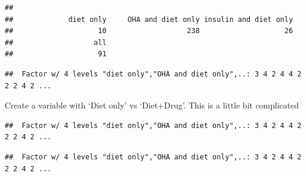 \documentclass[]{book}
\newenvironment{Shaded}{\begin{snugshade}}{\end{snugshade}}
\newcommand{\KeywordTok}[1]{\textcolor[rgb]{0.13,0.29,0.53}{\textbf{#1}}}
\newcommand{\OperatorTok}[1]{\textcolor[rgb]{0.81,0.36,0.00}{\textbf{#1}}}
\newcommand{\NormalTok}[1]{#1}
\theoremstyle{definition}
\theoremstyle{definition}
\theoremstyle{remark}
\begin{document}
\begin{verbatim}
## 
##             diet only     OHA and diet only insulin and diet only 
##                    10                   238                    26 
##                   all 
##                    91
\end{verbatim}

\begin{Shaded}
\end{Shaded}

\begin{verbatim}
##  Factor w/ 4 levels "diet only","OHA and diet only",..: 3 4 2 4 4 2 2 2 4 2 ...
\end{verbatim}

Create a variable with `Diet only' vs `Diet+Drug'. This is a little bit
complicated

\begin{Shaded}
\end{Shaded}

\begin{verbatim}
##  Factor w/ 4 levels "diet only","OHA and diet only",..: 3 4 2 4 4 2 2 2 4 2 ...
\end{verbatim}

\begin{Shaded}
\end{Shaded}

\begin{verbatim}
##  Factor w/ 4 levels "diet only","OHA and diet only",..: 3 4 2 4 4 2 2 2 4 2 ...
\end{verbatim}

\begin{Shaded}
\end{Shaded}
\end{document}
